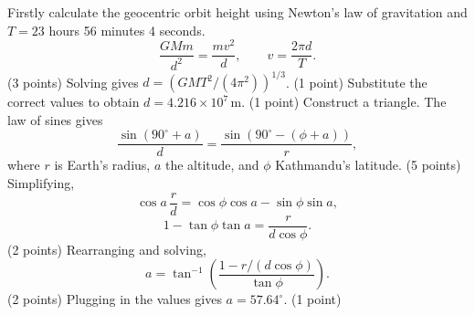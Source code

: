 Firstly calculate the geocentric orbit height using Newton's law of gravitation and $T=23$ hours 56 minutes 4 seconds.
\[\frac{GMm}{d^2}=\frac{mv^2}{d},\qquad v=\frac{2\pi d}{T}.\]
\hfill(3 points)
Solving gives $d=(GMT^2/(4\pi^2))^{1/3}$. \hfill(1 point)
Substitute the correct values to obtain $d=4.216\times10^7\,\mathrm m$. \hfill(1 point)
Construct a triangle. The law of sines gives
\[\frac{\sin(90^\circ+a)}{d}=\frac{\sin(90^\circ-(\phi+a))}{r},\]
where $r$ is Earth's radius, $a$ the altitude, and $\phi$ Kathmandu's latitude. \hfill(5 points)
Simplifying,
\[\cos a\,\frac rd=\cos\phi\cos a-\sin\phi\sin a,\]
\[1-\tan\phi\tan a=\frac r{d\cos\phi}.\]
\hfill(2 points)
Rearranging and solving,
\[a=\tan^{-1}\left(\frac{1-r/(d\cos\phi)}{\tan\phi}\right).\]
\hfill(2 points)
Plugging in the values gives $a=57.64^\circ$. \hfill(1 point)
